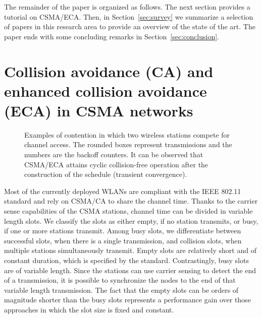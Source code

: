 \documentclass[journal]{IEEEtran}
\begin{document}

The remainder of the paper is organized as follows.
The next section provides a tutorial on CSMA/ECA.
Then, in Section~\ref{sec:survey} we summarize a selection of papers in this research area to provide an overview of the state of the art. 
The paper ends with some concluding remarks in Section~\ref{sec:conclusion}.

\section{Collision avoidance (CA) and enhanced collision avoidance (ECA) in CSMA networks}
\label{sec:eca}

\begin{figure}[!t]
\centering
{}
\caption{Examples of contention in which two wireless stations compete for channel access. The rounded boxes represent transmissions and the numbers are the backoff counters. It can be observed that CSMA/ECA attains cyclic collision-free operation after the construction of the schedule (transient convergence).}
\label{fig:ca_vs_eca}
\end{figure}

Most of the currently deployed WLANs are compliant with the IEEE 802.11 standard and rely on CSMA/CA to share the channel time.
Thanks to the carrier sense capabilities of the CSMA stations, channel time can be divided in variable length slots.
We classify the slots as either empty, if no station transmits, or busy, if one or more stations transmit.
Among busy slots, we differentiate between successful slots, when there is a single transmission, and collision slots, when multiple stations simultaneously transmit.
Empty slots are relatively short and of constant duration, which is specified by the standard.
Contrastingly, busy slots are of variable length. 
Since the stations can use carrier sensing to detect the end of a transmission, it is possible to synchronize the nodes to the end of that variable length transmission.
The fact that the empty slots can be orders of magnitude shorter than the busy slots represents a performance gain over those approaches in which the slot size is fixed and constant.
\end{document}
